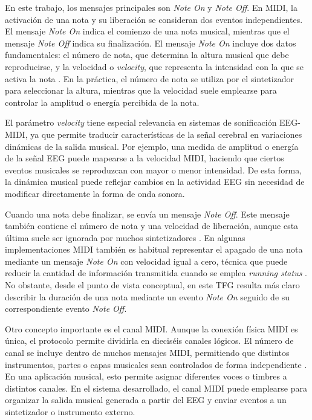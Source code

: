 \documentclass[../main.tex]{subfiles}
\begin{document}
En este trabajo, los mensajes principales son \textit{Note On} y \textit{Note Off}. En MIDI, la activación de una nota y su liberación se consideran dos eventos independientes. El mensaje \textit{Note On} indica el comienzo de una nota musical, mientras que el mensaje \textit{Note Off} indica su finalización. El mensaje \textit{Note On} incluye dos datos fundamentales: el número de nota, que determina la altura musical que debe reproducirse, y la velocidad o \textit{velocity}, que representa la intensidad con la que se activa la nota \cite{Heckroth1995}. En la práctica, el número de nota se utiliza por el sintetizador para seleccionar la altura, mientras que la velocidad suele emplearse para controlar la amplitud o energía percibida de la nota.

El parámetro \textit{velocity} tiene especial relevancia en sistemas de sonificación EEG-MIDI, ya que permite traducir características de la señal cerebral en variaciones dinámicas de la salida musical. Por ejemplo, una medida de amplitud o energía de la señal EEG puede mapearse a la velocidad MIDI, haciendo que ciertos eventos musicales se reproduzcan con mayor o menor intensidad. De esta forma, la dinámica musical puede reflejar cambios en la actividad EEG sin necesidad de modificar directamente la forma de onda sonora.

Cuando una nota debe finalizar, se envía un mensaje \textit{Note Off}. Este mensaje también contiene el número de nota y una velocidad de liberación, aunque esta última suele ser ignorada por muchos sintetizadores \cite{Heckroth1995}. En algunas implementaciones MIDI también es habitual representar el apagado de una nota mediante un mensaje \textit{Note On} con velocidad igual a cero, técnica que puede reducir la cantidad de información transmitida cuando se emplea \textit{running status} \cite{Heckroth1995}. No obstante, desde el punto de vista conceptual, en este TFG resulta más claro describir la duración de una nota mediante un evento \textit{Note On} seguido de su correspondiente evento \textit{Note Off}.

Otro concepto importante es el canal MIDI. Aunque la conexión física MIDI es única, el protocolo permite dividirla en dieciséis canales lógicos. El número de canal se incluye dentro de muchos mensajes MIDI, permitiendo que distintos instrumentos, partes o capas musicales sean controlados de forma independiente \cite{Heckroth1995}. En una aplicación musical, esto permite asignar diferentes voces o timbres a distintos canales. En el sistema desarrollado, el canal MIDI puede emplearse para organizar la salida musical generada a partir del EEG y enviar eventos a un sintetizador o instrumento externo.
\end{document}
